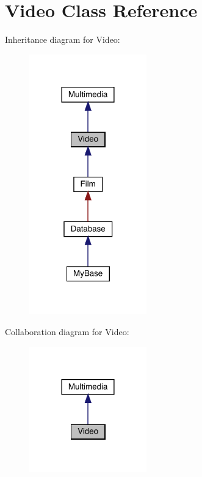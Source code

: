 \hypertarget{class_video}{}\section{Video Class Reference}
\label{class_video}


Inheritance diagram for Video\+:
\nopagebreak
\begin{figure}[H]
\begin{center}
\leavevmode
\includegraphics[width=144pt]{class_video__inherit__graph}
\end{center}
\end{figure}


Collaboration diagram for Video\+:
\nopagebreak
\begin{figure}[H]
\begin{center}
\leavevmode
\includegraphics[width=144pt]{class_video__coll__graph}
\end{center}
\end{figure}
